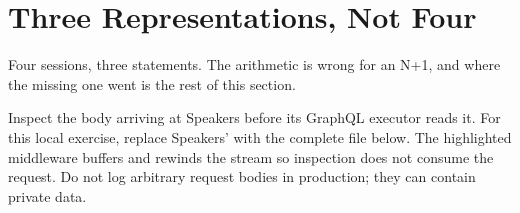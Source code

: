 \section{Three Representations, Not Four}
\label{sec:ch10-three-representations-not-four}

%
Four sessions, three statements. The arithmetic is wrong for an N+1, and where
the missing one went is the rest of this section.

%
Inspect the body arriving at Speakers before its GraphQL executor reads it.
For this local exercise, replace Speakers'  with the
complete file below. The highlighted middleware buffers and rewinds the
stream so inspection does not consume the request.
Do not log arbitrary request bodies in production; they can contain private
data.

